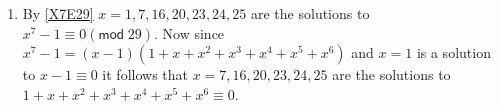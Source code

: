 \documentclass[12pt]{article}
\renewcommand{\pmod}[1]{\left(\mathsf{mod}\;#1\right)}
\begin{document}
\begin{enumerate}
\item %
By \autoref{X7E29}
$x=1,7,16,20,23,24,25$ are the solutions to $x^7-1\equiv 0\pmod{29}$.
Now since $x^7-1=\left(x-1\right)\left(1+x+x^2+x^3+x^4+x^5+x^6\right)$
and $x=1$ is a solution to $x-1\equiv 0$ it follows that
$x=7,16,20,23,24,25$ are the solutions to 
$1+x+x^2+x^3+x^4+x^5+x^6\equiv 0$.


\end{enumerate}
\end{document}
